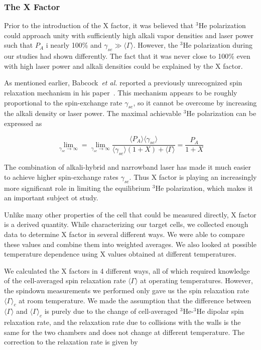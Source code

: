 \subsubsection{The X Factor}

Prior to the introduction of the X factor, it was believed that $^{3}$He polarization could approach unity with sufficiently high alkali vapor densities and laser power such that $P_{A}$ i nearly 100\% and $\gamma_{se} \gg \langle \Gamma \rangle$. However, the $^{3}$He polarization during our studies had shown differently. The fact that it was never close to 100\% even with high laser power and alkali densities could be explained by the X factor.

As mentioned earlier, Babcock~\emph{et al.} reported a previously unrecognized spin relaxation mechanism in his paper~\cite{PhysRevLett.96.083003}. This mechanism appears to be roughly proportional to the spin-exchange rate $\gamma_{se}$, so it cannot be overcome by increasing the alkali density or laser power. The maximal achievable $^{3}$He polarization can be expressed as

\begin{equation}
\lim_{\gamma_{se}\to\infty}=\lim_{\gamma_{se}\to\infty}\frac{\langle P_{A}\rangle\langle \gamma_{se}\rangle}{\langle\gamma_{se}\rangle(1+X)+\langle\Gamma\rangle}=\frac{P_{A}}{1+X}
\end{equation}

The combination of alkali-hybrid and narrowband laser has made it much easier to achieve higher spin-exchange rates $\gamma_{se}$. Thus X factor is playing an increasingly more significant role in limiting the equilibrium $^{3}$He polarization, which makes it an important subject ot study.

Unlike many other properties of the cell that could be measured directly, X factor is a derived quantity. While characterizing our target cells, we collected enough data to determine X factor in several different ways. We were able to compare these values and combine them into weighted averages. We also looked at possible temperature dependence using X values obtained at different temperatures.

We calculated the X factors in 4 different ways, all of which required knowledge of the cell-averaged spin relaxation rate $\langle \Gamma\rangle$ at operating temperatures. However, the spindown measurements we performed only gave us the spin relaxation rate $\langle \Gamma\rangle_{c}$ at room temperature. We made the assumption that the difference between $\langle \Gamma\rangle$ and $\langle \Gamma\rangle_{c}$ is purely due to the change of cell-averaged $^{3}$He-$^{3}$He dipolar spin relaxation rate, and the relaxation rate due to collisions with the walls is the same for the two chambers and does not change at different temperature. The correction to the relaxation rate is given by

